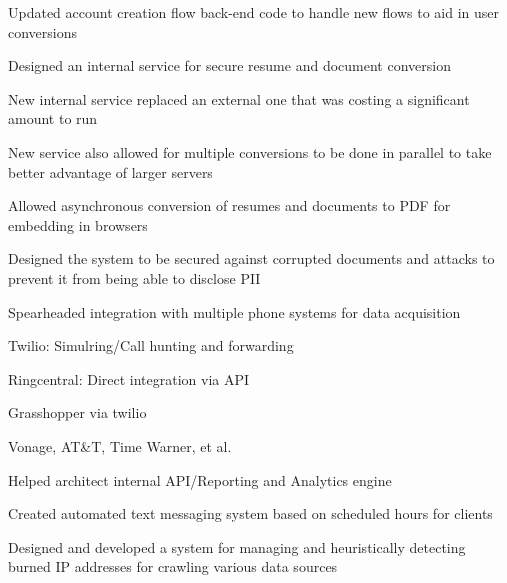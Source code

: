 \documentclass[table,tmargin=1in,bmargin=1in,letterpaper]{resume}
\begin{document}
\begin{compactitem}
\item Updated account creation flow back-end code to handle new flows to aid in user conversions
\item Designed an internal service for secure resume and document conversion
  \begin{compactitem}
  \item New internal service replaced an external one that was costing a significant amount to run
  \item New service also allowed for multiple conversions to be done in parallel to take better advantage of larger servers
  \item Allowed asynchronous conversion of resumes and documents to PDF for embedding in browsers
  \item Designed the system to be secured against corrupted documents and attacks to prevent it from being able to disclose PII
  \end{compactitem}
\end{compactitem}

\begin{compactitem}
\item Spearheaded integration with multiple phone systems for data acquisition
  \begin{compactitem}
  \item Twilio: Simulring/Call hunting and forwarding
  \item Ringcentral: Direct integration via API
  \item Grasshopper via twilio
  \item Vonage, AT\&T, Time Warner, et al.
  \end{compactitem}
\item Helped architect internal API/Reporting and Analytics engine
\item Created automated text messaging system based on scheduled hours for clients
\item Designed and developed a system for managing and heuristically detecting burned IP addresses for crawling various data sources 
\end{compactitem}
\end{document}
